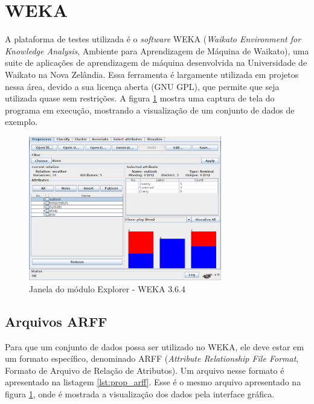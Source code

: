 \section{WEKA}
\label{sec:prop_weka}

A plataforma de testes utilizada é o \emph{software} WEKA (\emph{Waikato Environment for Knowledge Analysis}, Ambiente para Aprendizagem de Máquina de Waikato), uma suite de aplicações de aprendizagem de máquina desenvolvida na Universidade de Waikato na Nova Zelândia. Essa ferramenta é largamente utilizada em projetos nessa área, devido a sua licença aberta (GNU GPL), que permite que seja utilizada quase sem restrições. A figura \ref{fig:prop_weka} mostra uma captura de tela do programa em execução, mostrando a visualização de um conjunto de dados de exemplo.

\begin{figure}[h]
    \vspace{0.5cm}
    \centering
    \caption{Janela do módulo Explorer - WEKA 3.6.4}
    \label{fig:prop_weka}
    \vspace{0.5cm}
    \includegraphics[width=0.75\textwidth]{img/weka.png}
    \vspace{0.5cm}
\end{figure}

\subsection{Arquivos ARFF}
\label{sec:prop_arff}

Para que um conjunto de dados possa ser utilizado no WEKA, ele deve estar em um formato específico, denominado ARFF (\emph{Attribute Relationship File Format}, Formato de Arquivo de Relação de Atributos). Um arquivo nesse formato é apresentado na listagem \ref{lst:prop_arff}. Esse é o mesmo arquivo apresentado na figura \ref{fig:prop_weka}, onde é mostrada a visualização dos dados pela interface gráfica.

